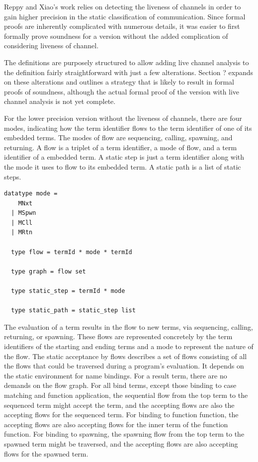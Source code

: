 \documentclass[letterpaper, 11pt]{extarticle}
\begin{document}
Reppy and Xiao's work relies on detecting the liveness of channels in order to gain higher
precision in the static classification of communication. Since formal proofs are inherently
complicated with numerous details, it was easier to first formally prove soundness for a
version without the added complication of considering liveness of channel.

The definitions are purposely structured to allow adding live channel analysis to the
definition fairly straightforward with just a few alterations.  Section ? expands on
these alterations and outlines a strategy that is likely to result in formal proofs of
soundness, although the actual formal proof of the version with live channel analysis is
not yet complete.  

For the lower precision version without the liveness of channels, there are four modes,
indicating how the term identifier flows to the term identifier of one of
its embedded terms.
The modes of flow are sequencing, calling, spawning, and returning. A flow is a
triplet of a term identifier, a mode of flow, and a term identifier of a
embedded term. A static step is just a term identifier along with the mode it uses to
flow to its embedded term. A static path is a list of static steps.  

\begin{lstlisting}[language=logic, mathescape]
  datatype mode =
    MNxt
  | MSpwn
  | MCll
  | MRtn

  type flow = termId * mode * termId

  type graph = flow set

  type static_step = termId * mode

  type static_path = static_step list
\end{lstlisting}

The evaluation of a term results in the flow to new terms,
via sequencing, calling, returning, or spawning.  These flows are represented concretely
by the term identifiers of the starting and ending terms and a mode
to represent the nature of the flow.
The static acceptance by flows describes a set of flows consisting of all the flows
that could be traversed during a program's evaluation.
It depends on the static environment for name bindings.
For a result term, there are no demands on the flow graph.  For all bind terms, except those binding
to case matching and function application, the sequential flow from the top term to
the sequenced term might accept the term, and the accepting flows are also the
accepting flows for the sequenced term.  For binding to function function, the
accepting flows are also accepting flows for the inner term of the
function function.  For binding to spawning, the spawning flow from the top term
to the spawned term might be traversed, and the accepting flows are also
accepting flows for the spawned term.
\end{document}
